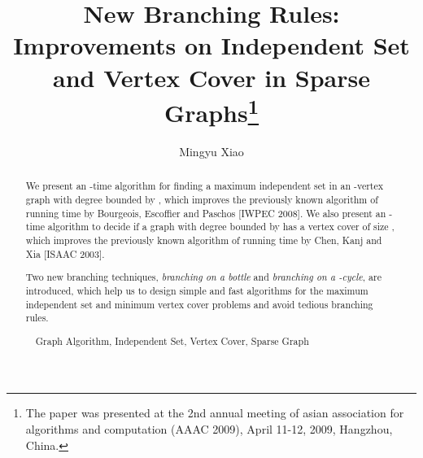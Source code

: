 \documentclass[runningheads]{llncs}
\begin{document}
\title{New Branching Rules: Improvements on Independent Set and Vertex Cover in Sparse Graphs\footnote{The paper was presented at the 2nd
annual meeting of asian association for algorithms and computation
(AAAC 2009), April 11-12, 2009, Hangzhou, China.}}


\author{Mingyu Xiao}
\authorrunning{}






 \tocauthor{} \maketitle


\begin{abstract}
We present an -time algorithm for finding a maximum
independent set in an -vertex graph with degree bounded by ,
which improves the previously known algorithm of running time
 by Bourgeois, Escoffier and Paschos [IWPEC 2008].
We also present an -time algorithm to decide if a
graph with degree bounded by  has a vertex cover of size ,
which improves the previously known algorithm of running time
 by Chen, Kanj and Xia [ISAAC 2003].

Two new branching techniques, \emph{branching on a bottle} and
\emph{branching on a -cycle}, are introduced, which help us to
design simple and fast algorithms for the maximum independent set
and minimum vertex cover problems and avoid tedious branching
rules.


\vspace{5mm} \ \ Graph Algorithm,
Independent Set, Vertex Cover, Sparse Graph
\end{abstract}
\end{document}
